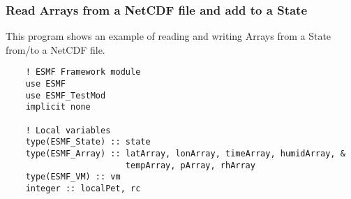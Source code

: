  
\setlength{\oldparskip}{\parskip}
\setlength{\parskip}{1.5ex}
\setlength{\oldparindent}{\parindent}
\setlength{\parindent}{0pt}
\setlength{\oldbaselineskip}{\baselineskip}
\setlength{\baselineskip}{11pt}
 
\def\bv{\begin{verbatim}}
\def\ev{\end{verbatim}}
\def\be{\begin{equation}}
\def\ee{\end{equation}}
\def\bea{\begin{eqnarray}}
\def\eea{\end{eqnarray}}
\def\bi{\begin{itemize}}
\def\ei{\end{itemize}}
\def\bn{\begin{enumerate}}
\def\en{\end{enumerate}}
\def\bd{\begin{description}}
\def\ed{\end{description}}
\def\({\left (}
\def\){\right )}
\def\[{\left [}
\def\]{\right ]}
\def\<{\left  \langle}
\def\>{\right \rangle}
\def\cI{{\cal I}}
\def\diag{\mathop{\rm diag}}
\def\tr{\mathop{\rm tr}}


 

  \subsubsection{Read Arrays from a NetCDF file and add to a State}
   \label{example:StateRdWr}
   This program shows an example of reading and writing Arrays from a State
   from/to a NetCDF file. 

 \begin{verbatim}
    ! ESMF Framework module
    use ESMF
    use ESMF_TestMod
    implicit none

    ! Local variables
    type(ESMF_State) :: state
    type(ESMF_Array) :: latArray, lonArray, timeArray, humidArray, &
                        tempArray, pArray, rhArray
    type(ESMF_VM) :: vm
    integer :: localPet, rc
 
\end{verbatim}
 
